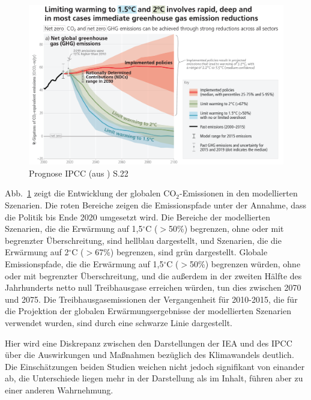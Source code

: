 \documentclass{article}
\begin{document}
\begin{figure}[h]
	\centering
		\includegraphics[width=1.00\textwidth]{../Figures/IPCC_AR6_SYR_SPM_Figure5.png}
	\caption{Prognose IPCC (aus \cite{lee_ipcc_2023}) S.22}
	\label{fig:IPCC_AR6_SYR_SPM}
\end{figure}

Abb.~\ref{fig:IPCC_AR6_SYR_SPM} zeigt  die Entwicklung der globalen  CO$_2$-Emissionen in den modellierten Szenarien.  Die roten Bereiche zeigen die Emissionspfade unter der Annahme, dass die Politik bis Ende 2020 umgesetzt wird. Die Bereiche der modellierten Szenarien, die die Erwärmung auf 1,5$^\circ$C ($>$50\%) begrenzen, ohne oder mit begrenzter Überschreitung, sind hellblau dargestellt, und Szenarien, die die Erwärmung auf 2$^\circ$C ($>$67\%) begrenzen, sind grün dargestellt. Globale Emissionspfade, die die Erwärmung auf 1,5$^\circ$C ($>$50\%) begrenzen würden, ohne oder mit begrenzter Überschreitung, und die außerdem in der zweiten Hälfte des Jahrhunderts netto null Treibhausgase erreichen würden, tun dies zwischen 2070 und 2075. Die Treibhausgasemissionen der Vergangenheit für 2010-2015, die für die Projektion der globalen Erwärmungsergebnisse der modellierten Szenarien verwendet wurden, sind durch eine
schwarze Linie dargestellt.


Hier wird eine Diskrepanz zwischen den Darstellungen der IEA und des IPCC über die Auswirkungen und Maßnahmen bezüglich des Klimawandels deutlich. Die Einschätzungen beiden Studien weichen nicht jedoch signifikant von einander  ab,  die Unterschiede liegen  mehr in der Darstellung als im Inhalt, führen aber zu einer anderen Wahrnehmung.
\end{document}
